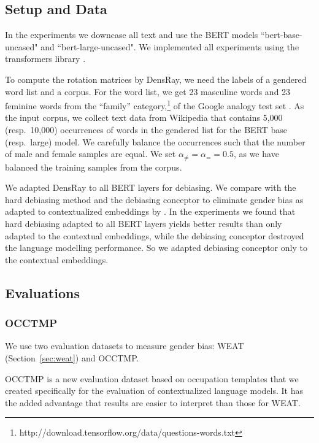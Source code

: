 \subsection{Setup and Data}
In the experiments we downcase all  text  and use the BERT models ``bert-base-uncased" and ``bert-large-uncased". We implemented all experiments using the transformers library \cite{wolf2019huggingfaces}.

To compute the rotation matrices by DensRay, we need the
labels of a gendered word list and a corpus. For the word
list, we get 23 masculine words and 23 feminine words from
the ``family''
category,\footnote{http://download.tensorflow.org/data/questions-words.txt}
of the Google analogy test set . As the input corpus, we collect text data from Wikipedia that contains 5,000 (resp.\ 10,000)
occurrences of words in the gendered list for the BERT base
(resp.\ large) model. We carefully balance the occurrences such that the number of male and female samples are equal. We set  $\alpha_{\neq}=\alpha_{=}=0.5$, as we have balanced the training samples from the corpus.

We adapted DensRay to all BERT layers for debiasing. We compare with the hard debiasing method \cite{mu2018all} and the debiasing conceptor \cite{karve2019conceptor} to eliminate gender bias as adapted to contextualized embeddings by \cite{karve2019conceptor}. In the experiments we found that hard debiasing adapted to all BERT layers yields better results than only adapted to the contextual embeddings, while the debiasing conceptor destroyed the language modelling performance. So we adapted debiasing conceptor only to the contextual embeddings. 

\subsection{Evaluations}
\subsubsection{OCCTMP}
We use two evaluation datasets
to measure gender
bias: WEAT (Section~\ref{sec:weat}) and OCCTMP.

OCCTMP is a new evaluation dataset
based on occupation templates
that we created specifically
for
the evaluation of contextualized language models.  It has
the added advantage that results are easier to interpret
than those for WEAT.

